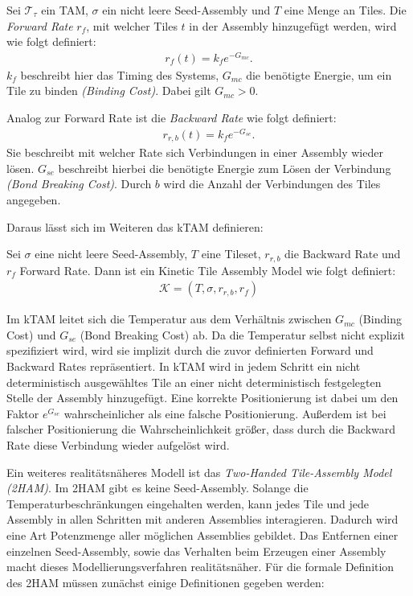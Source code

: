 \begin{definition}
	Sei $\mathcal{T}_\tau$ ein TAM, $\sigma$ ein nicht leere Seed-Assembly und $T$ eine Menge an Tiles. Die \emph{Forward Rate} $r_f$, mit welcher Tiles $t$ in der Assembly hinzugefügt werden, wird wie folgt definiert:
	\begin{align*}
		r_f(t) = k_fe^{-G_{mc}}.
	\end{align*}
	$k_f$ beschreibt hier das Timing des Systems, $G_{mc}$ die benötigte Energie, um ein Tile zu binden \emph{(Binding Cost)}. Dabei gilt $G_{mc} > 0$.
\end{definition}
\begin{definition}
	Analog zur Forward Rate ist die \emph{Backward Rate} wie folgt definiert:
	\begin{align*}
		r_{r,b}(t) = k_fe^{-G_{se}}.
	\end{align*}
	Sie beschreibt mit welcher Rate sich Verbindungen in einer Assembly wieder lösen. $G_{se}$ beschreibt hierbei die benötigte Energie zum Lösen der Verbindung \emph{(Bond Breaking Cost)}. Durch $b$ wird die Anzahl der Verbindungen des Tiles angegeben.
\end{definition}

Daraus lässt sich im Weiteren das kTAM definieren:
\begin{definition}
	Sei $\sigma$ eine nicht leere Seed-Assembly, $T$ eine Tileset, $r_{r,b}$ die Backward Rate und $r_f$ Forward Rate. Dann ist ein Kinetic Tile Assembly Model wie folgt definiert:
	\begin{align*}
		\mathcal{K} = (T,\sigma,r_{r,b},r_f)
	\end{align*}
\end{definition}
Im kTAM leitet sich die Temperatur aus dem Verhältnis zwischen $G_{mc}$ (Binding Cost) und $G_{se}$ (Bond Breaking Cost) ab. Da die Temperatur selbst nicht explizit spezifiziert wird, wird sie implizit durch die zuvor definierten Forward und Backward Rates repräsentiert.
In kTAM wird in jedem Schritt ein nicht deterministisch ausgewähltes Tile an einer nicht deterministisch festgelegten Stelle der Assembly hinzugefügt. Eine korrekte Positionierung ist dabei um den Faktor $e^{G_{se}}$ wahrscheinlicher als eine falsche Positionierung. Außerdem ist bei falscher Positionierung die Wahrscheinlichkeit größer, dass durch die Backward Rate diese Verbindung wieder aufgelöst wird.

Ein weiteres realitätsnäheres Modell ist das \emph{Two-Handed Tile-Assembly Model (2HAM)}. 
Im 2HAM gibt es keine Seed-Assembly. Solange die Temperaturbeschränkungen eingehalten werden, kann jedes Tile und jede Assembly in allen Schritten mit anderen Assemblies interagieren. Dadurch wird eine Art Potenzmenge aller möglichen Assemblies gebildet.
Das Entfernen einer einzelnen Seed-Assembly, sowie das Verhalten beim Erzeugen einer Assembly macht dieses Modellierungsverfahren realitätsnäher.
Für die formale Definition des 2HAM müssen zunächst einige Definitionen gegeben werden:

